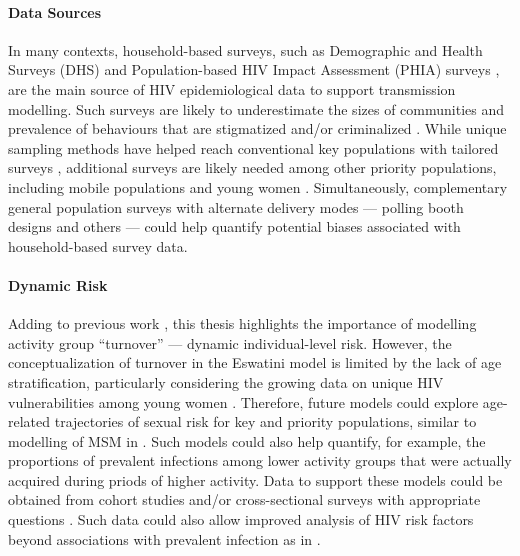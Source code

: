 \paragraph{Data Sources}
In many contexts, household-based surveys, such as
Demographic and Health Surveys (DHS) \cite{DHS} and
Population-based HIV Impact Assessment (PHIA) surveys \cite{PHIA},
are the main source of HIV epidemiological data to support transmission modelling.
Such surveys are likely to underestimate
the sizes of communities and prevalence of behaviours that are stigmatized and/or criminalized
\cite{Fenton2001,Mishra2008,Lowndes2012,Behanzin2013}.
While unique sampling methods have helped
reach conventional key populations with tailored surveys \cite{UNAIDS2010kps,UNAIDSKPA},
additional surveys are likely needed among other priority populations,
including mobile populations and young women \cite{Akullian2017,Camlin2019,Cheuk2020}.
Simultaneously, complementary general population surveys with alternate delivery modes
--- \eg polling booth designs \cite{Lowndes2012,Behanzin2013} and others \cite{Langhaug2010} ---
could help quantify potential biases associated with household-based survey data.
\paragraph{Dynamic Risk}
Adding to previous work \cite{Henry2015,Knight2020},
this thesis highlights the importance of modelling activity group ``turnover''
--- \ie dynamic individual-level risk.
However, the conceptualization of turnover in the Eswatini model
is limited by the lack of age stratification, particularly considering
the growing data on unique HIV vulnerabilities among young women \cite{Wamoyi2016,Cheuk2020,Ma2020}.
Therefore, future models could explore age-related trajectories of sexual risk
for key and priority populations, similar to modelling of MSM in \cite{Rozhnova2019,Basten2021}.
Such models could also help quantify, for example,
the proportions of prevalent infections among lower activity groups
that were actually acquired during priods of higher activity.
Data to support these models could be obtained from
cohort studies and/or cross-sectional surveys with appropriate questions
\cite{McKinnon2014,McKinnon2015,Olawore2018}.
Such data could also allow improved analysis of HIV risk factors
beyond associations with prevalent infection as in .
